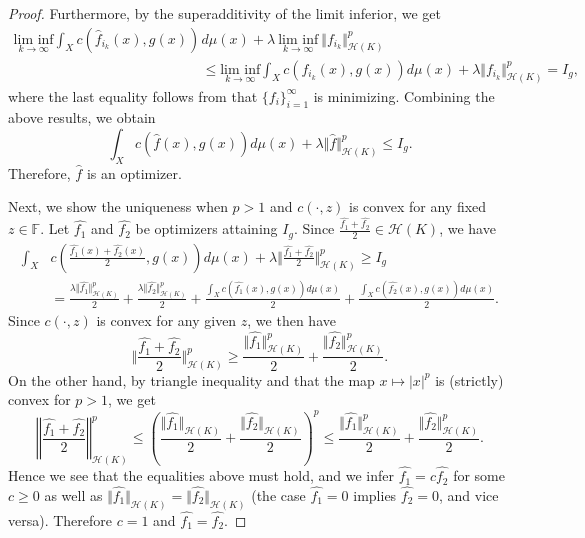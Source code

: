 \documentclass{amsart}
\numberwithin{equation}{section}
\theoremstyle{plain}
\theoremstyle{remark}
\theoremstyle{definition}
\begin{document}
\begin{proof}
Furthermore, by the superadditivity of the limit inferior, we get 
\begin{equation*}
\begin{split}
      \underset{k \rightarrow \infty}{\text{lim inf}} \int_{X}  c( \hat{f}_{i_k}(x), g(x)) &d\mu(x) + \lambda \ \underset{k \rightarrow \infty}{\text{lim inf}}  \ \Vert f_{i_k} \Vert^p_{\mathscr{H}(K)}  \\
      &\leq \underset{k \rightarrow \infty}{\text{lim inf}} \int_{X} c( f_{i_k}(x), g(x))  d\mu(x) + \lambda \Vert f_{i_k} \Vert^p_{\mathscr{H}(K)}=I_g,
\end{split}
\end{equation*}
where the last equality follows from that $\{f_i\}_{i=1}^{\infty}$ is minimizing. 
Combining the above results, we obtain
\begin{equation*}
     \int_{X}  c (\hat{f}(x), g(x)) d\mu(x) + \lambda \Vert \hat{f} \Vert^p_{\mathscr{H}(K)} \leq  I_g.
\end{equation*}
Therefore, $\hat{f}$ is an optimizer.
\par

Next, we show the uniqueness when $p > 1$ and $c(\cdot,z)$ is convex for any fixed $z \in \mathbb{F}$.
Let $\hat{f_1}$ and $\hat{f_2}$ be optimizers attaining $I_g$. 
Since $\frac{\hat{f_1}+\hat{f_2}}{2} \in \mathscr{H}(K)$, we have 
\begin{equation*}
\begin{split}
     \int_{X}&  c (\frac{\hat{f_1}(x)+\hat{f_2}(x)}{2}, g(x)) d\mu(x)  +  \lambda \Vert \frac{\hat{f_1}+\hat{f_2}}{2} \Vert^p_{\mathscr{H}(K)}
     \geq I_g\\
     &=\frac{\lambda \Vert \hat{f_1} \Vert^p_{\mathscr{H}(K)}}{2} +  \frac{\lambda \Vert \hat{f_2} \Vert^p_{\mathscr{H}(K)}}{2} +  \frac{\int_{X} c (\hat{f_1}(x), g(x)) d\mu(x)}{2} +  \frac{\int_{X} c (\hat{f_2}(x), g(x)) d\mu(x)}{2}. 
\end{split}
\end{equation*}
Since $c(\cdot,z)$ is convex for any given $z$, we then have
\begin{equation*}
     \Vert \frac{\hat{f_1}+\hat{f_2}}{2} \Vert^p_{\mathscr{H}(K)}
     \geq \frac{\Vert \hat{f_1} \Vert^p_{\mathscr{H}(K)}}{2} +  \frac{\Vert \hat{f_2} \Vert^p_{\mathscr{H}(K)}}{2}.
\end{equation*}
On the other hand, by triangle inequality and that the map $x \mapsto |x|^p$ is (strictly) convex for $p> 1$, we get
\begin{equation*}
    \left\Vert \frac{\hat{f_1}+\hat{f_2}}{2} \right \Vert^p_{\mathscr{H}(K)}
    \leq \left(\frac{\Vert \hat{f_1} \Vert_{\mathscr{H}(K)}}{2} +  \frac{\Vert \hat{f_2} \Vert_{\mathscr{H}(K)}}{2}\right)^p
    \leq \frac{\Vert \hat{f_1} \Vert^p_{\mathscr{H}(K)}}{2} +  \frac{\Vert \hat{f_2} \Vert^p_{\mathscr{H}(K)}}{2}.
\end{equation*}
Hence we see that the equalities above must hold, and we infer $\hat{f_1}=c\hat{f_2}$ for some $c\geq 0$ as well as $\Vert \hat{f_1} \Vert_{\mathscr{H}(K)}=\Vert \hat{f_2} \Vert_{\mathscr{H}(K)}$ 
(the case $\hat{f_1}=0$ implies $\hat{f_2}=0$, and vice versa).
Therefore $c=1$ and  $\hat{f_1}=\hat{f_2}$.
\qedhere
\end{proof}
\end{document}
